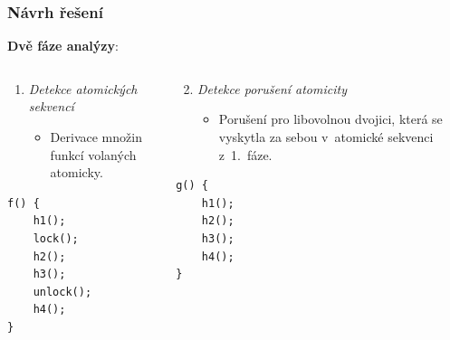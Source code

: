 \documentclass[10pt, xcolor=pdflatex, hyperref={unicode}]{beamer}
\begin{document}
\begin{frame}[fragile]\frametitle{Návrh řešení}
	\textbf{Dvě fáze analýzy}:

	\begin{columns}[t]
		\begin{column}{0.5 \linewidth}
			\centering
			\begin{enumerate}
				\item
					\emph{Detekce atomických sekvencí}

					\begin{itemize}
						\setlength\itemsep{0.5em}

						\item
							Derivace množin funkcí volaných
							atomicky.
					\end{itemize}
			\end{enumerate}

			\begin{lstlisting}
f() {
	h1();
	lock();
	h2();
	h3();
	unlock();
	h4();
}
			\end{lstlisting}

		\end{column}

		\begin{column}{0.5 \linewidth}
			\centering
			\begin{enumerate}
				\setcounter{enumi}{1}

				\item
					\emph{Detekce porušení atomicity}

					\begin{itemize}
						\setlength\itemsep{0.5em}

						\item
							Porušení pro libovolnou dvojici, která
							se vyskytla za sebou v~atomické sekvenci
							z~1.~fáze.
					\end{itemize}
			\end{enumerate}

			\begin{lstlisting}
g() {
	h1();
	h2();
	h3();
	h4();
}
			\end{lstlisting}

		\end{column}
	\end{columns}
\end{frame}
\end{document}
